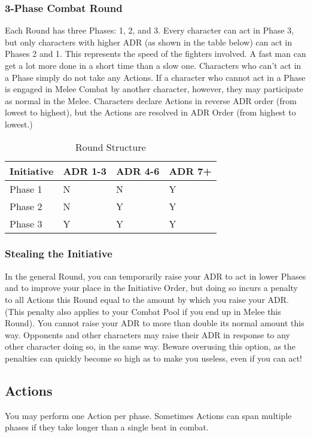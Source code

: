 \documentclass[oneside,11pt,english]{book}
\begin{document}
\subsubsection{3-Phase Combat Round}
Each Round has three Phases: 1, 2, and 3. Every character can act in Phase 3, but only characters with
higher ADR (as shown in the table below) can act in Phases 2 and 1. This represents the speed of the
fighters involved. A fast man can get a lot more done in a short time than a slow one. Characters who
can’t act in a Phase simply do not take any Actions. If a character who cannot act in a Phase is engaged in
Melee Combat by another character, however, they may participate as normal in the Melee.
Characters declare Actions in reverse ADR order (from lowest to highest), but the Actions are resolved in ADR Order (from highest to lowest.)
\begin{table}[!hb]
	\centering
	\caption{Round Structure}
	\label{tab:Round Structure}
	\begin{tabu} spread 0pt {X[2,l] *{3}{X}}
		Initiative&ADR 1-3&ADR 4-6&ADR 7+\\\toprule
		Phase 1&  	N  &	N & 	Y\\
		Phase 2&  	N  &	Y & 	Y\\
		Phase 3&  	Y  &	Y & 	Y\\
	\end{tabu}
\end{table}
\subsubsection{Stealing the Initiative}
In the general Round, you can temporarily raise your ADR to act in lower Phases and to improve your
place in the Initiative Order, but doing so incurs a penalty to all Actions this Round equal to the amount
by which you raise your ADR. (This penalty also applies to your Combat Pool if you end up in Melee this
Round). You cannot raise your ADR to more than double its normal amount this way. Opponents and
other characters may raise their ADR in response to any other character doing so, in the same way.
Beware overusing this option, as the penalties can quickly become so high as to make you useless, even if
you can act!

\subsection{Actions}
You may perform one Action per phase. Sometimes Actions can span multiple phases if they take longer
than a single beat in combat.
\end{document}
